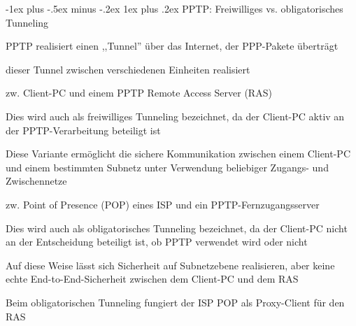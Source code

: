 \documentclass[a4paper]{article}
\makeatletter
\renewcommand{\subsubsection}{\@startsection{subsubsection}{3}{0mm}%
 {-1ex plus -.5ex minus -.2ex}%
 {1ex plus .2ex}%
 {\normalfont\small\bfseries}}
\makeatother
\begin{document}
\begin{multicols}{3}
      \subsubsection{PPTP: Freiwilliges vs. obligatorisches Tunneling}
      \begin{itemize*}
            \item PPTP realisiert einen ,,Tunnel'' über das Internet, der PPP-Pakete überträgt
            \item dieser Tunnel zwischen verschiedenen Einheiten realisiert
            \item zw. Client-PC und einem PPTP Remote Access Server (RAS)
            \begin{itemize*}
                  \item Dies wird auch als freiwilliges Tunneling bezeichnet, da der Client-PC aktiv an der PPTP-Verarbeitung beteiligt ist
                  \item Diese Variante ermöglicht die sichere Kommunikation zwischen einem Client-PC und einem bestimmten Subnetz unter Verwendung beliebiger Zugangs- und Zwischennetze
            \end{itemize*}
            \item zw. Point of Presence (POP) eines ISP und ein PPTP-Fernzugangsserver
            \begin{itemize*}
                  \item Dies wird auch als obligatorisches Tunneling bezeichnet, da der Client-PC nicht an der Entscheidung beteiligt ist, ob PPTP verwendet wird oder nicht
                  \item Auf diese Weise lässt sich Sicherheit auf Subnetzebene realisieren, aber keine echte End-to-End-Sicherheit zwischen dem Client-PC und dem RAS
                  \item Beim obligatorischen Tunneling fungiert der ISP POP als Proxy-Client für den RAS
            \end{itemize*}
      \end{itemize*}



\end{multicols}
\end{document}
